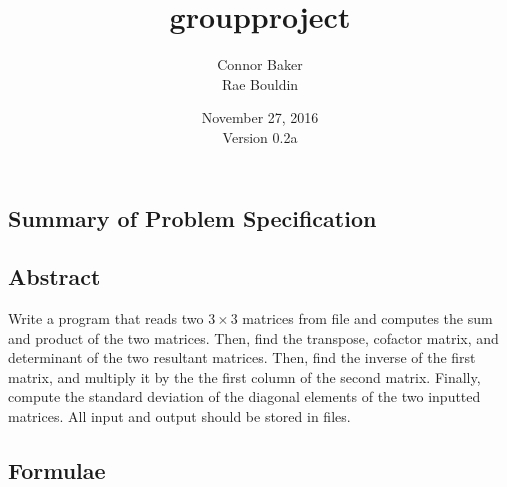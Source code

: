 \documentclass[12pt]{article}
\begin{document}
\null
\nointerlineskip 
\vfill
\let \snewpage \newpage
\let \newpage \relax
    \title{groupproject}
    \author{Connor Baker\\Rae Bouldin}
    \date{November 27, 2016\\Version 0.2a}
\maketitle
\let \newpage \snewpage
\vfill
\thispagestyle{empty}



\newpage %



\makeatletter
{}
\makeatother
\tableofcontents

\clearpage
{}

\begin{center}
\section{Summary of Problem Specification}
\end{center}
\subsection{Abstract}
Write a program that reads two $3\times3$ matrices from file and computes the sum and product of the two matrices. Then, find the transpose, cofactor matrix, and determinant of the two resultant matrices. Then, find the inverse of the first matrix, and multiply it by the the first column of the second matrix. Finally, compute the standard deviation of the diagonal elements of the two inputted matrices.
All input and output should be stored in files.



\newpage %



\begin{center}
\section{Formulae}
\end{center}
\end{document}
